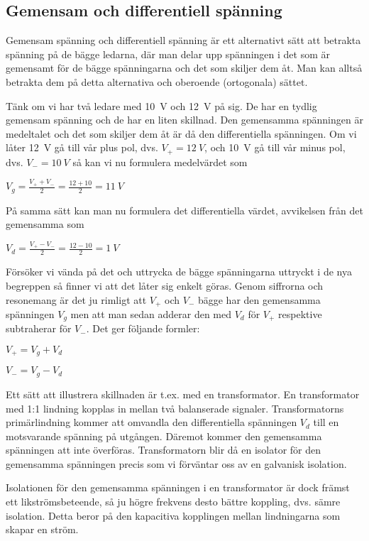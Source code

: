 \subsection{Gemensam och differentiell spänning}
\label{comdiffv}

Gemensam spänning och differentiell spänning är ett alternativt sätt att
betrakta spänning på de bägge ledarna, där man delar upp spänningen i det som
är gemensamt för de bägge spänningarna och det som skiljer dem åt. Man kan
alltså betrakta dem på detta alternativa och oberoende (ortogonala) sättet.

Tänk om vi har två ledare med 10~V och 12~V på sig. De har en tydlig gemensam
spänning och de har en liten skillnad. Den gemensamma spänningen är medeltalet
och det som skiljer dem åt är då den differentiella spänningen. Om vi låter
12~V gå till vår plus pol, dvs. \(V_+ = 12\ V\), och 10~V gå till vår minus pol,
dvs. \(V_- = 10\ V\) så kan vi nu formulera medelvärdet som

\(V_g = \frac{V_+ + V_-}{2} = \frac{12+10}{2} = 11\ V\)

På samma sätt kan man nu formulera det differentiella värdet, avvikelsen från
det gemensamma som

\(V_d = \frac{V_+ - V_-}{2} = \frac{12-10}{2} = 1\ V\)

Försöker vi vända på det och uttrycka de bägge spänningarna uttryckt i de nya
begreppen så finner vi att det låter sig enkelt göras. Genom siffrorna och
resonemang är det ju rimligt att \(V_+\) och \(V_-\) bägge har den gemensamma
spänningen \(V_g\) men att man sedan adderar den med \(V_d\) för \(V_+\)
respektive subtraherar för \(V_-\). Det ger följande formler:

\(V_+ = V_g + V_d\)

\(V_- = V_g - V_d\)

Ett sätt att illustrera skillnaden är t.ex. med en transformator.
En transformator med 1:1 lindning kopplas in mellan två balanserade signaler.
Transformatorns primärlindning kommer att omvandla den differentiella spänningen
\(V_d\) till en motsvarande spänning på utgången. Däremot kommer den gemensamma
spänningen att inte överföras. Transformatorn blir då en isolator för den
gemensamma spänningen precis som vi förväntar oss av en galvanisk isolation.

Isolationen för den gemensamma spänningen i en transformator är dock främst ett
likströmsbeteende, så ju högre frekvens desto bättre koppling, dvs. sämre
isolation. Detta beror på den kapacitiva kopplingen mellan lindningarna som
skapar en ström.

